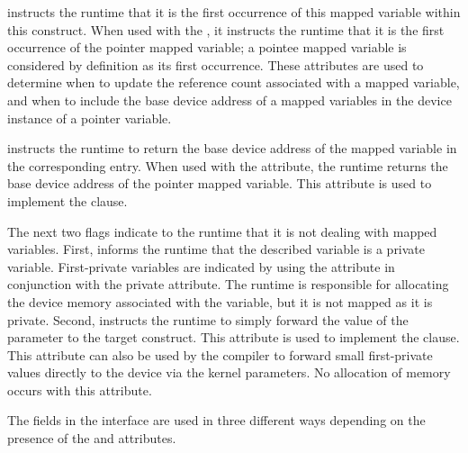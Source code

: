  instructs the runtime that it is the first occurrence of this mapped variable within this construct.  When used with  the , it instructs the runtime that it is the first occurrence of the pointer mapped variable; a pointee mapped variable is considered by definition as its first occurrence. These attributes are used to determine when to update the reference count associated with a mapped variable, and when to include the base device address of a mapped variables in the device instance of a pointer variable. 

 instructs the runtime to return the base device address of the mapped variable in the corresponding  entry. When used with  the  attribute, the runtime returns the base device address of the pointer mapped variable. This attribute is used to implement the  clause.

The next two flags indicate to the runtime that it is not dealing with mapped variables.  First,  informs the runtime that the described variable is a private variable. First-private variables are indicated by using the    attribute in conjunction with the private attribute. The runtime is responsible for allocating the device memory associated with the variable, but it is not mapped as it is private. Second,  instructs the runtime to simply forward the value of the  parameter to the target construct.  This attribute is used to implement the  clause. This attribute can also be used by the compiler to forward small first-private values directly to the device via the kernel parameters. No allocation of memory occurs with this attribute.

The fields in the interface are used in three different ways depending on the presence of the  and  attributes.

